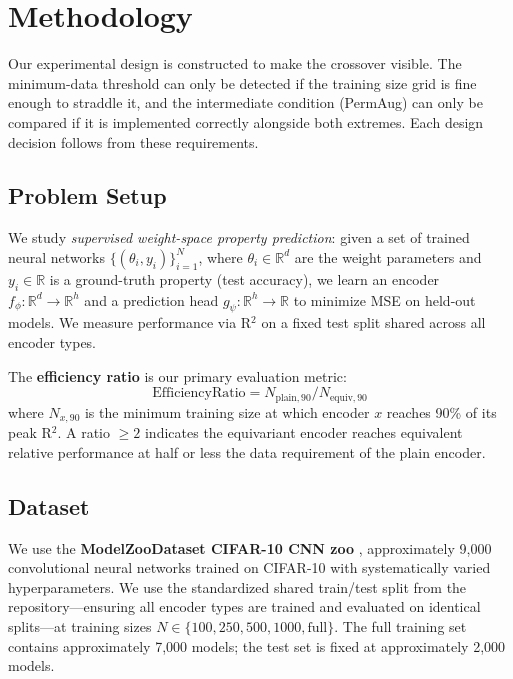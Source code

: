 \section{Methodology}
\label{sec:method}

Our experimental design is constructed to make the crossover visible. The minimum-data threshold can only be detected if the training size grid is fine enough to straddle it, and the intermediate condition (PermAug) can only be compared if it is implemented correctly alongside both extremes. Each design decision follows from these requirements.

\subsection{Problem Setup}

We study \emph{supervised weight-space property prediction}: given a set of trained neural networks $\{(\theta_i, y_i)\}_{i=1}^N$, where $\theta_i \in \mathbb{R}^d$ are the weight parameters and $y_i \in \mathbb{R}$ is a ground-truth property (test accuracy), we learn an encoder $f_\phi: \mathbb{R}^d \to \mathbb{R}^h$ and a prediction head $g_\psi: \mathbb{R}^h \to \mathbb{R}$ to minimize MSE on held-out models. We measure performance via R$^2$ on a fixed test split shared across all encoder types.

The \textbf{efficiency ratio} is our primary evaluation metric:
\begin{equation}
    \text{EfficiencyRatio} = N_{\text{plain},90} / N_{\text{equiv},90}
\end{equation}
where $N_{x,90}$ is the minimum training size at which encoder $x$ reaches 90\% of its peak R$^2$. A ratio $\geq 2$ indicates the equivariant encoder reaches equivalent relative performance at half or less the data requirement of the plain encoder.

\subsection{Dataset}

We use the \textbf{ModelZooDataset CIFAR-10 CNN zoo} \cite{Schurholt2022Model}, approximately 9,000 convolutional neural networks trained on CIFAR-10 with systematically varied hyperparameters. We use the standardized shared train/test split from the repository---ensuring all encoder types are trained and evaluated on identical splits---at training sizes $N \in \{100, 250, 500, 1000, \text{full}\}$. The full training set contains approximately 7,000 models; the test set is fixed at approximately 2,000 models.

